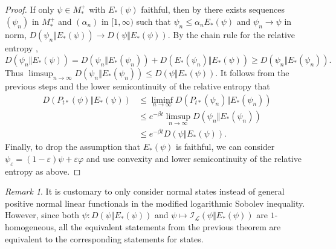 \documentclass[12pt,a4paper]{amsart}
\newcommand{\1}{\mathds{1}}
\renewcommand{\epsilon}{\varepsilon}
\renewcommand{\phi}{\varphi}
\newcommand{\I}{\mathcal I}
\renewcommand{\L}{\mathcal L}
\theoremstyle{plain}
\theoremstyle{definition}
\theoremstyle{remark}
\newtheorem{remark}[proposition]{Remark}
\begin{document}
\begin{proof}
If only $\psi\in M_\ast^+$ with $E_\ast(\psi)$ faithful, then by \cite[Lemma 5, Theorem 5]{FHSW22} there exists sequences $(\psi_n)$ in $M_\ast^+$ and $(\alpha_n)$ in $[1,\infty)$ such that $\psi_n\leq \alpha_n E_\ast(\psi)$ and $\psi_n\to \psi$ in norm, $D(\psi_n\Vert E_\ast(\psi))\to D(\psi\Vert E_\ast(\psi))$. By the chain rule for the relative entropy \cite[Theorem 2]{Pet91},
\begin{equation*}
    D(\psi_n\Vert E_\ast(\psi))=D(\psi_n\Vert E_\ast(\psi_n))+D(E_\ast(\psi_n)\Vert E_\ast(\psi))\geq D(\psi_n\Vert E_\ast(\psi_n)).
\end{equation*}
Thus $\limsup_{n\to\infty}D(\psi_n\Vert E_\ast(\psi_n))\leq D(\psi\Vert E_\ast(\psi))$. It follows from the previous steps and the lower semicontinuity of the relative entropy that
\begin{align*}
    D(P_{t\ast}(\psi)\Vert E_\ast(\psi))
    &\leq \liminf_{n\to\infty}D(P_{t\ast}(\psi_n)\Vert E_\ast(\psi_n))\\
    &\leq e^{-\beta t}\limsup_{n\to\infty}D(\psi_n\Vert E_\ast(\psi_n))\\
    &\leq e^{-\beta t}D(\psi\Vert E_\ast(\psi)).
\end{align*}
Finally, to drop the assumption that $E_\ast(\psi)$ is faithful, we can consider $\psi_\epsilon=(1-\epsilon)\psi+\epsilon\phi$ and use convexity and lower semicontinuity of the relative entropy as above.
\end{proof}

\begin{remark}
    It is customary to only consider normal states instead of general positive normal linear functionals in the modified logarithmic Sobolev inequality. However, since both $\psi\colon D(\psi\Vert E_\ast(\psi))$ and $\psi\mapsto \I_\L(\psi\Vert E_\ast(\psi))$ are $1$-homogeneous, all the equivalent statements from the previous theorem are equivalent to the corresponding statements for states.
\end{remark}
\end{document}
